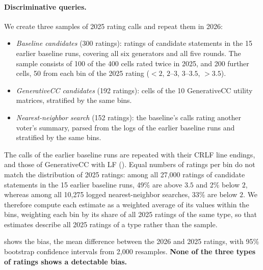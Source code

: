 \documentclass[letterpaper]{article} %
\begin{document}
\paragraph{Discriminative queries.}
We create three samples of 2025 rating calls and repeat them in 2026:
\begin{itemize}
    \item \emph{Baseline candidates} (300 ratings): ratings of candidate statements in the 15 earlier baseline runs, covering all six generators and all five rounds.
    The sample consists of 100 of the 400 cells rated twice in 2025, and 200 further cells, 50 from each bin of the 2025 rating (\(<2\), \(2\)--\(3\), \(3\)--\(3.5\), \(>3.5\)).
    \item \emph{GenerativeCC candidates} (192 ratings): cells of the 10 GenerativeCC utility matrices, stratified by the same bins.
    \item \emph{Nearest-neighbor search} (152 ratings): the baseline's calls rating another voter's summary, parsed from the logs of the earlier baseline runs and stratified by the same bins.
\end{itemize}
The calls of the earlier baseline runs are repeated with their CRLF line endings, and those of GenerativeCC with LF ().
Equal numbers of ratings per bin do not match the distribution of 2025 ratings: among all 27{,}000 ratings of candidate statements in the 15 earlier baseline runs, 49\% are above \(3.5\) and 2\% below \(2\), whereas among all 10{,}275 logged nearest-neighbor searches, 33\% are below \(2\).
We therefore compute each estimate as a weighted average of its values within the bins, weighting each bin by its share of all 2025 ratings of the same type, so that estimates describe all 2025 ratings of a type rather than the sample.

 shows the bias, the mean difference between the 2026 and 2025 ratings, with 95\% bootstrap confidence intervals from 2{,}000 resamples.
\textbf{None of the three types of ratings shows a detectable bias.}
\end{document}
